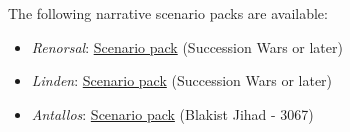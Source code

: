 The following narrative scenario packs are available:

\begin{itemize}

\item \emph{Renorsal}: \href{https://raw.githubusercontent.com/Eudicods/outworlds-wastes/rules-pdf/renorsal.pdf}{Scenario pack} (Succession Wars or later)

\item \emph{Linden}: \href{https://raw.githubusercontent.com/Eudicods/outworlds-wastes/rules-pdf/linden.pdf}{Scenario pack} (Succession Wars or later)

\item \emph{Antallos}: \href{https://raw.githubusercontent.com/Eudicods/outworlds-wastes/rules-pdf/antallos.pdf}{Scenario pack} (Blakist Jihad - 3067)

\end{itemize}
